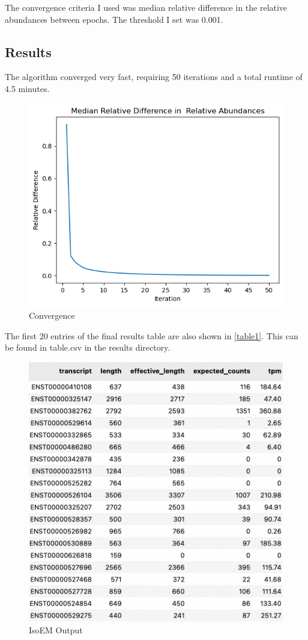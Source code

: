 \documentclass{article}
\begin{document}
The convergence criteria I used was median relative difference in the relative abundances between epochs. The threshold I set was 0.001.

\subsection*{Results}

The algorithm converged very fast, requiring 50 iterations and a total runtime of 4.5 minutes.

\begin{figure}[H]
    \centering
      \includegraphics[width=0.8\linewidth]{./images/convergence.png}
  \caption{Convergence}\label{figure1}%
\end{figure}

The first 20 entries of the final results table are also shown in \autoref{table1}. This can be found in table.csv in the results directory.

\begin{figure}[H]
    \centering
      \includegraphics[width=0.8\linewidth]{./images/table.png}
  \caption{IsoEM Output}\label{table1}%
\end{figure}
\end{document}
